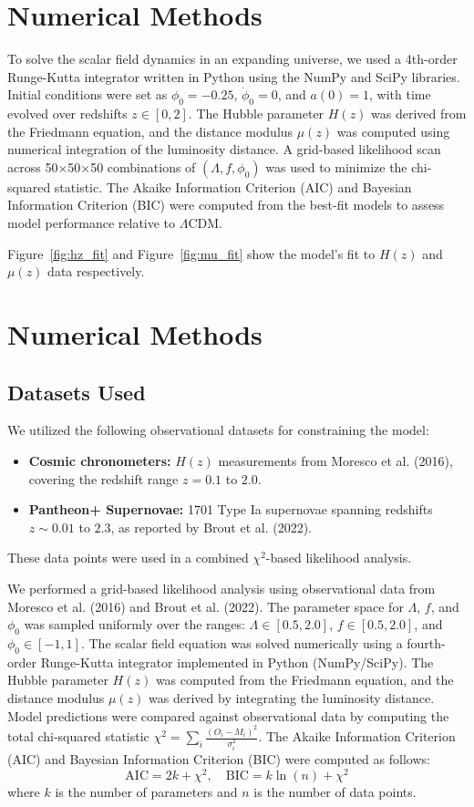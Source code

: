 \documentclass[12pt]{article}
\begin{document}
\section*{Numerical Methods}
To solve the scalar field dynamics in an expanding universe, we used a 4th-order Runge-Kutta integrator written in Python using the NumPy and SciPy libraries. Initial conditions were set as $\phi_0 = -0.25$, $\dot{\phi}_0 = 0$, and $a(0) = 1$, with time evolved over redshifts $z \in [0, 2]$. The Hubble parameter $H(z)$ was derived from the Friedmann equation, and the distance modulus $\mu(z)$ was computed using numerical integration of the luminosity distance. A grid-based likelihood scan across 50×50×50 combinations of $(\Lambda, f, \phi_0)$ was used to minimize the chi-squared statistic. The Akaike Information Criterion (AIC) and Bayesian Information Criterion (BIC) were computed from the best-fit models to assess model performance relative to $\Lambda$CDM.

Figure~\ref{fig:hz_fit} and Figure~\ref{fig:mu_fit} show the model’s fit to $H(z)$ and $\mu(z)$ data respectively.

\section{Numerical Methods}

\subsection{Datasets Used}

We utilized the following observational datasets for constraining the model:

\begin{itemize}
    \item \textbf{Cosmic chronometers:} $H(z)$ measurements from Moresco et al. (2016), covering the redshift range $z = 0.1$ to $2.0$.
    \item \textbf{Pantheon+ Supernovae:} 1701 Type Ia supernovae spanning redshifts $z \sim 0.01$ to $2.3$, as reported by Brout et al. (2022).
\end{itemize}

These data points were used in a combined $\chi^2$-based likelihood analysis.


We performed a grid-based likelihood analysis using observational data from Moresco et al. (2016) and Brout et al. (2022). The parameter space for $\Lambda$, $f$, and $\phi_0$ was sampled uniformly over the ranges: $\Lambda \in [0.5, 2.0]$, $f \in [0.5, 2.0]$, and $\phi_0 \in [-1, 1]$. The scalar field equation was solved numerically using a fourth-order Runge-Kutta integrator implemented in Python (NumPy/SciPy). The Hubble parameter $H(z)$ was computed from the Friedmann equation, and the distance modulus $\mu(z)$ was derived by integrating the luminosity distance. Model predictions were compared against observational data by computing the total chi-squared statistic $\chi^2 = \sum_i \frac{(O_i - M_i)^2}{\sigma_i^2}$. The Akaike Information Criterion (AIC) and Bayesian Information Criterion (BIC) were computed as follows:
\[ \mathrm{AIC} = 2k + \chi^2, \quad \mathrm{BIC} = k \ln(n) + \chi^2 \]
where $k$ is the number of parameters and $n$ is the number of data points.
\end{document}
